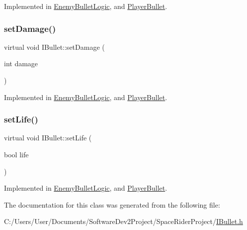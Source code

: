 Implemented in \hyperlink{class_enemy_bullet_logic_aaa5273b969347ce8c6e62261ccc3df3a}{Enemy\+Bullet\+Logic}, and \hyperlink{class_player_bullet_a8469319697d70e04399d8aaac3902c80}{Player\+Bullet}.

\mbox{\label{class_i_bullet_a072298555accb47f11b84f4c781ae876}} 
\subsubsection{\texorpdfstring{set\+Damage()}{setDamage()}}
{\footnotesize\ttfamily virtual void I\+Bullet\+::set\+Damage (\begin{DoxyParamCaption}\item[{int}]{damage }\end{DoxyParamCaption})\hspace{0.3cm}{\ttfamily [pure virtual]}}



Implemented in \hyperlink{class_enemy_bullet_logic_a3e4ce40e06e9fa23826bd74015fd75f2}{Enemy\+Bullet\+Logic}, and \hyperlink{class_player_bullet_a09347ab7665742fc7d492fe26c3a6bce}{Player\+Bullet}.

\mbox{\label{class_i_bullet_abf99befdaa121e7c9ca2acc2ed75b513}} 
\subsubsection{\texorpdfstring{set\+Life()}{setLife()}}
{\footnotesize\ttfamily virtual void I\+Bullet\+::set\+Life (\begin{DoxyParamCaption}\item[{bool}]{life }\end{DoxyParamCaption})\hspace{0.3cm}{\ttfamily [pure virtual]}}



Implemented in \hyperlink{class_enemy_bullet_logic_a92e4dfb6a528114ad58f9ae64924fbab}{Enemy\+Bullet\+Logic}, and \hyperlink{class_player_bullet_af713549c4bb9a2400a7929564f5b81ff}{Player\+Bullet}.



The documentation for this class was generated from the following file\+:\begin{DoxyCompactItemize}
\item 
C\+:/\+Users/\+User/\+Documents/\+Software\+Dev2\+Project/\+Space\+Rider\+Project/\hyperlink{_i_bullet_8h}{I\+Bullet.\+h}\end{DoxyCompactItemize}
